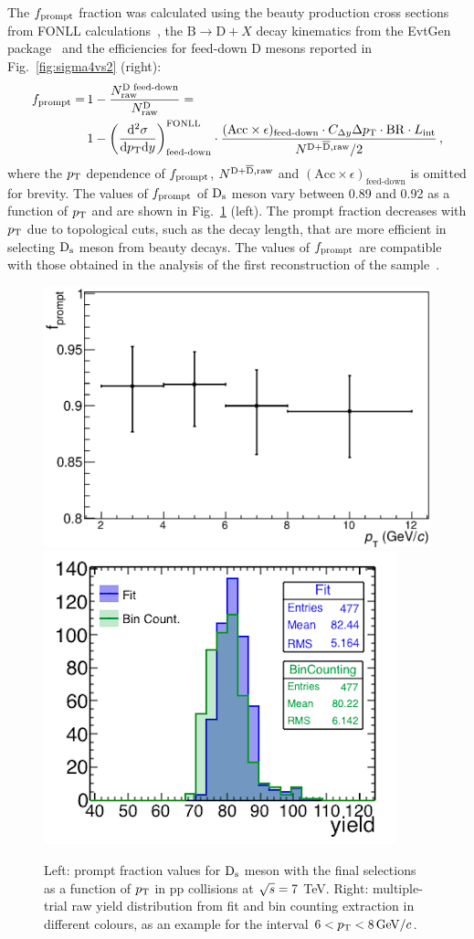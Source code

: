 The $f_{\rm prompt}$ fraction was calculated using the beauty production cross sections from  
FONLL calculations~\cite{Cacciari:1998it, Cacciari:2001td}, the 
$\mathrm{B} \rightarrow \mathrm{D} + X$ decay kinematics from the EvtGen package~\cite{Lange:2001uf} 
and the efficiencies for feed-down D mesons reported in 
Fig.~\ref{fig:sigma4vs2} (right):
\begin{equation}
\label{eq:fpr}
\begin{split}
f_{\mathrm{prompt}} = \, & 1- \frac{N^{\text{D~feed-down}}_{\mathrm{raw}}}{N^{\mathrm{D}}_{\mathrm{raw}}}=\\
& 1- \left (\frac{\rm d^2 \sigma}{\mathrm dp_{\rm T} \mathrm d y} \right)^{\rm FONLL}_{\text{feed-down}} \cdot \frac{(\mathrm{Acc} \times \epsilon)_\text{feed-down} \cdot C_{\Delta y} \Delta p_{\rm T} \cdot \mathrm{BR} \cdot L_{\rm int}}{N^{\rm D +\overline{D},raw}/2}\,,
\end{split}
\end{equation}
where the $p_{\rm T}$ dependence of $f_{\rm prompt}$, $N^{\rm D +\overline{D},raw}$ and
$(\mathrm{Acc} \times \epsilon)_\text{feed-down}$ is omitted for brevity.
The values of $f_{\rm prompt}$ of ${\rm D_s}$ meson vary between 0.89 and 0.92 as a function
of $p_{\rm T}$ and are shown in Fig.~\ref{fig:fpromptAndMT} (left). 
The prompt fraction decreases with $p_{\rm T}$
due to topological cuts, such as the decay length, that are more efficient
in selecting ${\rm D_s}$ meson from beauty decays. The values of $f_{\rm prompt}$
are compatible with those obtained in the analysis of the first reconstruction of the sample~\cite{Abelev:2012tca}. 
\begin{figure}[!t]
\begin{center}
\includegraphics[width=.49\textwidth]{FigCap4/promptFraction_pass4.eps}
 \includegraphics[width=.47\textwidth]{FigCap4/MT_pt68.png}
\caption{Left: prompt fraction values for ${\rm D_s}$ meson with the final selections as a function of $p_{\rm T}$ in pp collisions at $\sqrt{s} = 7$ TeV. Right: multiple-trial raw yield distribution from fit and bin counting extraction in different colours, as an example for the interval $6 < p_{\rm T} < 8 \, \mathrm{GeV}/c$.}
\label{fig:fpromptAndMT}
\end{center}
\end{figure}



